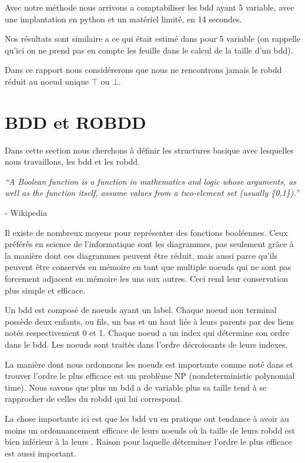 \documentclass[french]{article}
\begin{document}
Avec notre méthode nous arrivons a comptabiliser les bdd ayant 5 variable, avec une implantation en python et un matériel limité, en 14 secondes.\medskip

Nos résultats sont similaire a ce qui était estimé dans \cite{newton} pour 5 variable (on rappelle qu'ici on ne prend pas en compte les feuille dans le calcul de la taille d'un bdd).\medskip

Dans ce rapport nous considérerons que nous ne rencontrons jamais le robdd réduit au noeud unique \(\top\) ou \(\bot.\)
\newpage
\section{BDD et ROBDD}
Dans cette section nous cherchons à définir les structures basique avec lesquelles nous travaillons, les bdd et les robdd.

\begin{center}
\emph{“A Boolean function is a function in mathematics and logic whose arguments, as well as the function itself, assume values from a two-element set (usually \{0,1\}).”} 
\end{center}

- Wikipedia 
\vspace{5mm} %

Il existe de nombreux moyens pour représenter des fonctions booléennes. Ceux préférés en science de l'informatique sont les diagrammes, pas seulement grâce à la manière dont ces diagrammes peuvent être réduit, mais aussi parce qu'ils peuvent être conservés en mémoire en tant que multiple noeuds qui ne sont pas forcement adjacent en mémoire les uns aux autres. Ceci rend leur conservation plus simple et efficace.

Un bdd est composé de noeuds ayant un label. Chaque noeud non terminal possède deux enfants, ou fils, un bas et un haut liés à leurs parents par des liens notés respectivement 0 et 1. Chaque noeud a un index qui détermine son ordre dans le bdd. Les noeuds sont traités dans l'ordre décroissants de leurs indexes.

La manière dont nous ordonnons les noeuds est importante comme noté dans \cite{newton} et trouver l'ordre le plus efficace est un problème NP (nondeterministic polynomial time). Nous savons que plus un bdd a de variable plus sa taille tend à se rapprocher de celles du robdd qui lui correspond.

La chose importante ici est que les bdd vu en pratique ont tendance à avoir au moins un ordonnancement efficace de leurs noeuds où la taille de leurs robdd est bien inférieur à la leurs \cite{gropl}. Raison pour laquelle déterminer l'ordre le plus efficace est aussi important.
\end{document}
